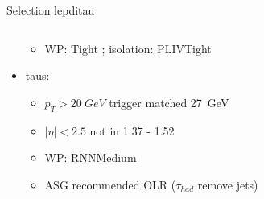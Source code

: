 \begin{frame}{Selection lepditau}
\begin{columns}
\begin{column}{0.7\textwidth}
\begin{itemize}
\begin{itemize}
          \item WP: Tight ; isolation: PLIVTight
        \end{itemize}
        \item taus:
        \vspace*{-0.02\textwidth}
        \begin{itemize}
          \footnotesize
          \item $p_T>\SI{20}{GeV}$ trigger matched \SI{27}{GeV}
          \item $|\eta|<2.5$ not in 1.37 - 1.52
          \item WP: RNNMedium
          \item ASG recommended OLR ($\tau_{had}$ remove jets)
        \end{itemize}
      \end{itemize}
    \end{column}
  \end{columns}
\end{frame}

